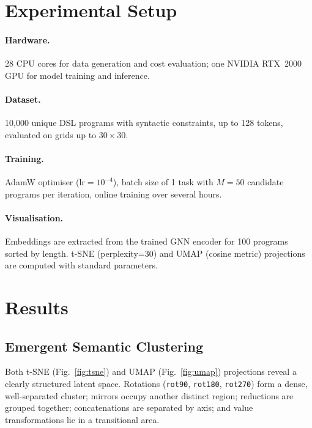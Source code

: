 \documentclass[final]{nesy2027}
\begin{document}
\section{Experimental Setup}
\label{sec:setup}

\paragraph{Hardware.}
28 CPU cores for data generation and cost evaluation; one NVIDIA RTX~2000 GPU
for model training and inference.

\paragraph{Dataset.}
10{,}000 unique DSL programs with syntactic constraints, up to 128 tokens,
evaluated on grids up to $30\times30$.

\paragraph{Training.}
AdamW optimiser ($\mathrm{lr}=10^{-4}$), batch size of 1 task with $M=50$
candidate programs per iteration, online training over several hours.

\paragraph{Visualisation.}
Embeddings are extracted from the trained GNN encoder for 100 programs sorted by
length.
t-SNE (perplexity=30) and UMAP (cosine metric) projections are computed with
standard parameters.

\section{Results}
\label{sec:results}

\subsection{Emergent Semantic Clustering}
\label{sec:clustering}

Both t-SNE (Fig.~\ref{fig:tsne}) and UMAP (Fig.~\ref{fig:umap}) projections
reveal a clearly structured latent space.
Rotations (\texttt{rot90}, \texttt{rot180}, \texttt{rot270}) form a dense,
well-separated cluster; mirrors occupy another distinct region; reductions are
grouped together; concatenations are separated by axis; and value transformations
lie in a transitional area.
\end{document}
